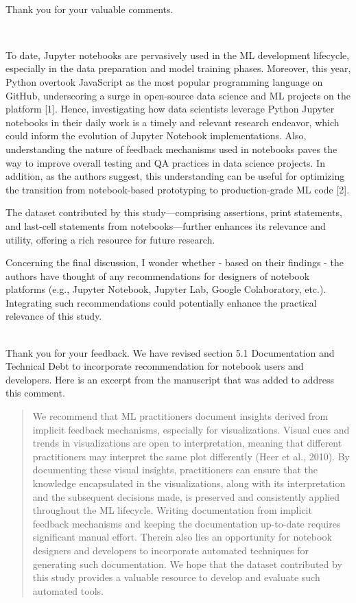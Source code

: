 \documentclass[11pt,fleqn]{article}
\newcommand{\eline}{\vspace*{.75\baselineskip}}
\newcommand{\Referee}[1]{\eline \noindent {\bf Reviewer comment #1:} \\}
\newcommand{\Us}{\eline \noindent {\bf Response:}\\}
\newenvironment{revcomment}[1][]
{\Referee{#1}\begin{rcomment}}
{\end{rcomment}}
\begin{document}
\Us Thank you for your valuable comments.

\begin{revcomment}[1.2]
  To date, Jupyter notebooks are pervasively used in the ML development lifecycle, especially in the data preparation and model training phases. Moreover, this year, Python overtook JavaScript as the most popular programming language on GitHub, underscoring a surge in open-source data science and ML projects on the platform [1]. Hence, investigating how data scientists leverage Python Jupyter notebooks in their daily work is a timely and relevant research endeavor, which could inform the evolution of Jupyter Notebook implementations. Also, understanding the nature of feedback mechanisms used in notebooks paves the way to improve overall testing and QA practices in data science projects. In addition, as the authors suggest, this understanding can be useful for optimizing the transition from notebook-based prototyping to production-grade ML code [2].

  The dataset contributed by this study—comprising assertions, print statements, and last-cell statements from notebooks—further enhances its relevance and utility, offering a rich resource for future research.

  Concerning the final discussion, I wonder whether - based on their findings - the authors have thought of any recommendations for designers of notebook platforms (e.g., Jupyter Notebook, Jupyter Lab, Google Colaboratory, etc.). Integrating such recommendations could potentially enhance the practical relevance of this study.
\end{revcomment}

\Us Thank you for your feedback. We have revised section 5.1 Documentation and Technical Debt to incorporate recommendation for notebook users and developers. Here is an excerpt from the manuscript that was added to address this comment.

\begin{quote}
  We recommend that ML practitioners document insights derived from implicit feedback mechanisms, especially for visualizations. Visual cues and trends in visualizations are open to interpretation, meaning that different practitioners may interpret the same plot differently (Heer et al., 2010). By documenting these visual insights, practitioners can ensure that the knowledge encapsulated in the visualizations, along with its interpretation and the subsequent decisions made, is preserved and consistently applied throughout the ML lifecycle. Writing documentation from implicit feedback mechanisms and keeping the documentation up-to-date requires significant manual effort. Therein also lies an opportunity for notebook designers and developers to incorporate automated techniques for generating such documentation. We hope that the dataset contributed by this study provides a valuable resource to develop and evaluate such automated tools.
\end{quote}
\end{document}
